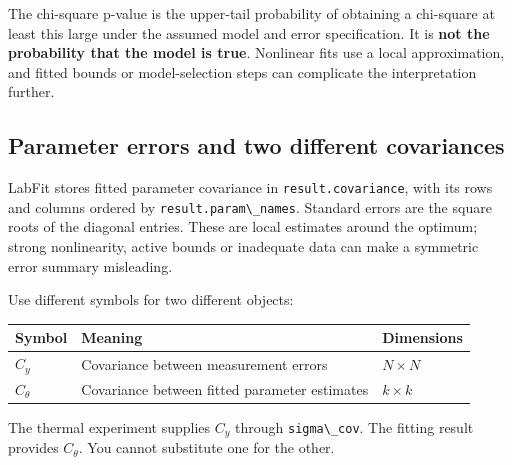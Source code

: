 \documentclass[
  british,
  10pt,
  a4paper,
]{article}
\newcommand{\passthrough}[1]{#1}
\begin{document}
The chi-square p-value is the upper-tail probability of obtaining a
chi-square at least this large under the assumed model and error
specification. It is \textbf{not the probability that the model is
true}. Nonlinear fits use a local approximation, and fitted bounds or
model-selection steps can complicate the interpretation further.


\subsection{Parameter errors and two different
covariances}\label{parameter-errors-and-two-different-covariances}

LabFit stores fitted parameter covariance in
\passthrough{\lstinline!result.covariance!}, with its rows and columns
ordered by \passthrough{\lstinline!result.param\_names!}. Standard
errors are the square roots of the diagonal entries. These are local
estimates around the optimum; strong nonlinearity, active bounds or
inadequate data can make a symmetric error summary misleading.

Use different symbols for two different objects:

\begin{longtable}[]{@{}
  >{\raggedright\arraybackslash}p{}
  >{\raggedright\arraybackslash}p{}
  >{\raggedright\arraybackslash}p{}@{}}
\toprule\noalign{}
\begin{minipage}[b]{\linewidth}\raggedright
Symbol
\end{minipage} & \begin{minipage}[b]{\linewidth}\raggedright
Meaning
\end{minipage} & \begin{minipage}[b]{\linewidth}\raggedright
Dimensions
\end{minipage} \\
\midrule\noalign{}
\endhead
\bottomrule\noalign{}
\endlastfoot
\(C_y\) & Covariance between measurement errors & \(N\times N\) \\
\(C_\theta\) & Covariance between fitted parameter estimates &
\(k\times k\) \\
\end{longtable}

The thermal experiment supplies \(C_y\) through
\passthrough{\lstinline!sigma\_cov!}. The fitting result provides
\(C_\theta\). You cannot substitute one for the other.
\end{document}
